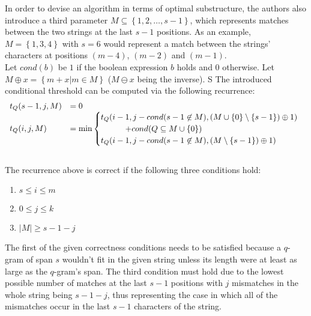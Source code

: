 \documentclass[paper=a4, fontsize=11pt]{scrartcl} %
\numberwithin{equation}{section} %
\numberwithin{figure}{section} %
\numberwithin{table}{section} %
\begin{document}
In order to devise an algorithm in terms of optimal substructure, the authors \cite{njihovPaper} also introduce a third parameter $M \subseteq \left\{1, 2, \dots, s - 1\right\}$, which represents matches between the two strings at the last $s - 1$ positions. As an example, $ M = \left\{1, 3, 4 \right\} $ with $ s = 6 $ would represent a match between the strings' characters at positions $(m - 4)$,  $(m - 2)$ and $(m - 1)$. \\

Let $ cond(b) $ be $ 1 $ if the boolean expression $b$ holds and $ 0 $ otherwise. Let $M \oplus x = \left\{ m + x | m \in M \right\}$ ($M \ominus x$ being the inverse). S The introduced conditional threshold can be computed via the following recurrence: \\
\begin{equation*}
  \begin{array}{ll@{}ll}
    t_Q(s - 1, j, M) & =  0 \\
    t_Q(i, j, M) & = \min 
      \begin{cases} 
        t_Q(i - 1, j - cond(s - 1 \not \in M), (M \cup \left\{0\right\} \setminus \left\{s - 1\right\}) \oplus 1) \\ \hspace{30pt} + cond(Q \subseteq M \cup \left\{0\right\}) \\ 
        t_Q(i - 1, j - cond(s - 1 \not \in M), (M \setminus \left\{s - 1\right\}) \oplus 1)
      \end{cases}
  \end{array}
\end{equation*}
\\

The recurrence above is correct if the following three conditions hold:
\begin{enumerate} \label{rec:correctness}
  \item $ s \leq i \leq m $
  \item $ 0 \leq j \leq k$
  \item $|M| \geq s - 1 - j$
\end{enumerate}
 The first of the given correctness conditions needs to be satisfied because a $q$-gram of span $s$ wouldn't fit in the given string unless its length were at least as large as the $q$-gram's span. The third condition must hold due to the lowest possible number of matches at the last $ s - 1 $ positions with $ j $ mismatches in the whole string being $ s - 1 - j $, thus representing the case in which all of the mismatches occur in the last $ s - 1 $ characters of the string. \\
\end{document}
